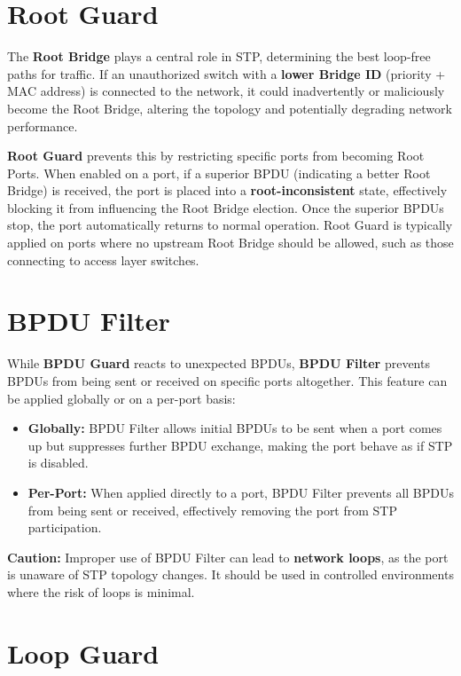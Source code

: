 \documentclass[a4paper]{book}
\begin{document}
\section*{Root Guard}

The \textbf{Root Bridge} plays a central role in STP, determining the best loop-free paths for traffic. If an unauthorized switch with a \textbf{lower Bridge ID} (priority + MAC address) is connected to the network, it could inadvertently or maliciously become the Root Bridge, altering the topology and potentially degrading network performance.

\textbf{Root Guard} prevents this by restricting specific ports from becoming Root Ports. When enabled on a port, if a superior BPDU (indicating a better Root Bridge) is received, the port is placed into a \textbf{root-inconsistent} state, effectively blocking it from influencing the Root Bridge election. Once the superior BPDUs stop, the port automatically returns to normal operation. Root Guard is typically applied on ports where no upstream Root Bridge should be allowed, such as those connecting to access layer switches.

\section*{BPDU Filter}

While \textbf{BPDU Guard} reacts to unexpected BPDUs, \textbf{BPDU Filter} prevents BPDUs from being sent or received on specific ports altogether. This feature can be applied globally or on a per-port basis:

\begin{itemize}
	\item \textbf{Globally:} BPDU Filter allows initial BPDUs to be sent when a port comes up but suppresses further BPDU exchange, making the port behave as if STP is disabled.
	\item \textbf{Per-Port:} When applied directly to a port, BPDU Filter prevents all BPDUs from being sent or received, effectively removing the port from STP participation.
\end{itemize}

\textbf{Caution:} Improper use of BPDU Filter can lead to \textbf{network loops}, as the port is unaware of STP topology changes. It should be used in controlled environments where the risk of loops is minimal.

\section*{Loop Guard}
\end{document}

